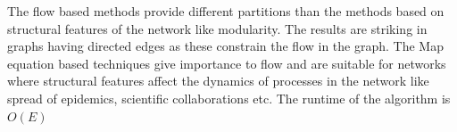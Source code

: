 The flow based methods provide different partitions than the methods based on structural features of the network like modularity. The results are striking in graphs having directed edges as these constrain the flow in the graph. The Map equation based techniques give importance to flow and are suitable for networks where structural features affect the dynamics of processes in the network like spread of epidemics, scientific collaborations etc. The runtime of the algorithm is $O(E)$       




%
%



%
%


